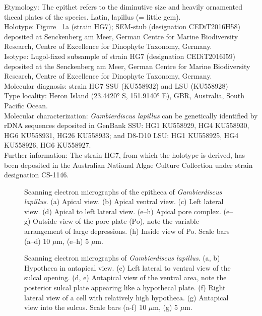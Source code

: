 \documentclass[12pt]{article}
\begin{document}
Etymology: The epithet refers to the diminutive size and heavily ornamented thecal plates of the species. Latin, lapillus (= little gem). \\
Holotype: Figure ~\ref{fig:epiSEM}a (strain HG7); SEM-stub (designation CEDiT2016H58) deposited at Senckenberg am Meer, German Centre for Marine Biodiversity Research, Centre of Excellence for Dinophyte Taxonomy, Germany. \\
Isotype: Lugol-fixed subsample of strain HG7 (designation CEDiT2016I59) deposited at the Senckenberg am Meer, German Centre for Marine Biodiversity Research, Centre of Excellence for Dinophyte Taxonomy, Germany. \\
Molecular diagnosis: strain HG7 SSU (KU558932) and LSU (KU558928)\\
Type locality: Heron Island (23.4420° S, 151.9140° E), GBR, Australia, South Pacific Ocean.\\
Molecular characterization: \textit{Gambierdiscus lapillus} can be genetically identified by rDNA sequences deposited in GenBank SSU: HG1 KU558929, HG4 KU558930, HG6 KU558931, HG26 KU558933; and D8-D10 LSU: HG1 KU558925, HG4 KU558926, HG6 KU558927. \\
Further information: The strain HG7, from which the holotype is derived, has been deposited in the Australian National Algae Culture Collection under strain designation CS-1146.


\begin{figure} 
\caption{Scanning electron micrographs of the epitheca of \textit{Gambierdiscus lapillus}. (a) Apical view. (b) Apical ventral view. (c) Left lateral view. (d) Apical to left lateral view. (e–h) Apical pore complex. (e–g) Outside view of the pore plate (Po), note the variable arrangement of large depressions. (h) Inside view of Po. Scale bars (a–d) 10 $\mu$m, (e–h) 5 $\mu$m.} 
\label{fig:epiSEM}
\end{figure} 

\begin{figure} 
\caption{Scanning electron micrographs of \textit{Gambierdiscus lapillus}. (a, b) Hypotheca in antapical view. (c) Left lateral to ventral view of the sulcal opening. (d, e) Antapical view of the ventral area, note the posterior sulcal plate appearing like a hypothecal plate. (f) Right lateral view of a cell with relatively high hypotheca. (g) Antapical view into the sulcus. Scale bars (a-f) 10 $\mu$m, (g) 5 $\mu$m.} 
\label{fig:hypoSEM}
\end{figure} 
\end{document}
